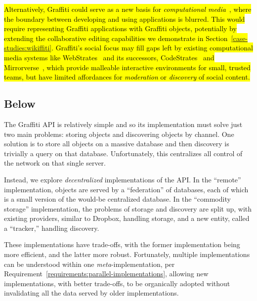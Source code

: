 \hl{%
Alternatively, Graffiti could serve as a new basis for
\emph{computational media}~{\cite{computationalmedia}},
where the boundary between developing and using applications is blurred.
This would require representing Graffiti applications with
Graffiti objects, potentially by extending the
collaborative editing capabilities we demonstrate in Section~{\ref{case-studies:wikiffiti}}.
Graffiti's social focus may fill gaps left by existing computational media
systems like WebStrates~{\cite{webstrates}} and its successors, CodeStrates~{\cite{codestrates}}
and Mirrorverse~{\cite{mirrorverse}}, which provide malleable interactive environments
for small, trusted teams, but have limited affordances
for \emph{moderation} or \emph{discovery} of social content.
}%

\subsection{Below}

The Graffiti API is relatively simple
and so its implementation must solve just two main problems:
storing objects and discovering objects by channel.
One solution is to store all objects on a massive database
and then discovery is trivially a query on that database.
Unfortunately, this centralizes all control of the network
on that single server.

Instead, we explore \emph{decentralized} implementations of the API.
In the ``remote'' implementation, objects are served by a ``federation'' of databases,
each of which is a small version of the would-be centralized database.
In the ``commodity storage'' implementation, the problems of storage and discovery are split up,
with existing providers, similar to Dropbox, handling storage,
and a new entity, called a ``tracker,'' handling discovery.

These implementations have trade-offs, with
the former implementation being more efficient,
and the latter more robust.
Fortunately, multiple implementations can be understood within one \emph{meta}-implementation,
per Requirement~\ref{requirements:parallel-implementations},
allowing new implementations,
with better trade-offs, to be organically adopted without
invalidating all the data served by older implementations.

